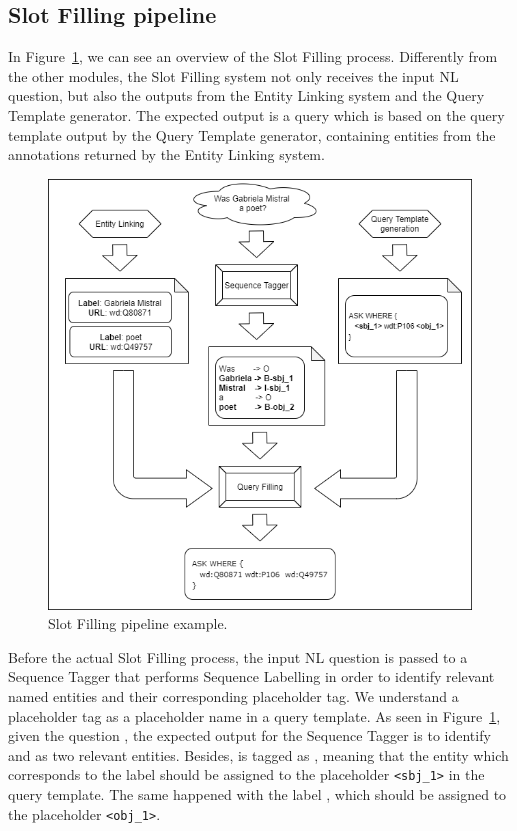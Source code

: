 \subsection{Slot Filling pipeline}
\label{cap3:system/slotFillModule/pipeline}
In Figure~\ref{fig:slotFillingPipeline}, we can see an overview of the Slot Filling process. 
Differently from the other modules, the Slot Filling system not only receives the input NL 
question, but also the outputs from the Entity Linking system and the Query Template generator. 
The expected output is a \SPARQL{} query which is based on the query template output by the 
Query Template generator, containing entities from the annotations returned by the Entity 
Linking system.

\begin{figure}[!h]
    \centering
    \includegraphics[scale=.5]{imagenes/3_system_overview/slotFillingPipeline.png}
    \caption{Slot Filling pipeline example.}
    \label{fig:slotFillingPipeline}
\end{figure}

Before the actual Slot Filling process, the input NL question is passed to a Sequence Tagger 
that performs Sequence Labelling in order to identify relevant named entities and their 
corresponding placeholder tag. We understand a placeholder tag as a placeholder name in a 
query template. As seen in Figure~\ref{fig:slotFillingPipeline}, given the question 
, the expected output for the Sequence Tagger is to 
identify  and  as two relevant entities. Besides, 
 is tagged as , meaning that the entity which 
corresponds to the label  should be assigned to the placeholder 
\texttt{<sbj\_1>} in the query template. The same happened with the label , 
which should be assigned to the placeholder \texttt{<obj\_1>}.

